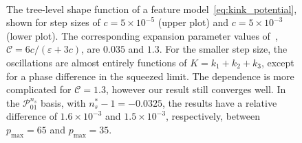 \documentclass[a4paper,12pt]{extarticle}
\newcommand{\Pmax}{p_\text{max}}
\newcommand{\Lnsboth}{\mathcal{P}^{n_s}_{01}}
\begin{document}
\begin{figure}[!pth]
\centering
    \\[-2ex]
\caption{
    The tree-level shape function of a feature
    model~\eqref{eq:kink_potential}, shown for step sizes of
    $c=5\times10^{-5}$ (upper plot)
    and $c=5\times10^{-3}$ (lower plot).
    The corresponding expansion parameter values of~\cite{adshead},
    ${\mathcal{C}=6c/(\varepsilon+3c)}$, are $0.035$
    and $1.3$.
    For the smaller step size, the oscillations are almost entirely functions of $K=k_1+k_2+k_3$,
    except for a phase difference in the squeezed limit.
    The dependence is more complicated for $\mathcal{C}=1.3$,
    however our result still converges well.
    In the $\Lnsboth$ basis, with $n_s^{*}-1 = -0.0325$,
    the results have a relative difference of $1.6\times10^{-3}$
    and $1.5\times10^{-3}$, respectively,
    between $\Pmax=65$ and $\Pmax=35$.
}\label{slice_plot_tanh}
\end{figure}
\end{document}
